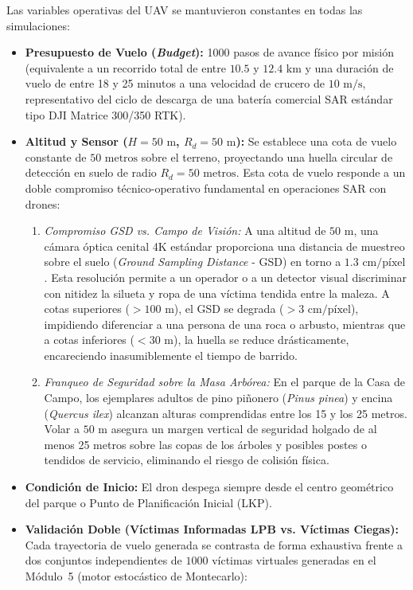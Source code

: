 Las variables operativas del UAV se mantuvieron constantes en todas las simulaciones:
\begin{itemize}
    \item \textbf{Presupuesto de Vuelo (\textit{Budget}):} 1000 pasos de avance físico por misión (equivalente a un recorrido total de entre $10.5$ y $12.4\text{ km}$ y una duración de vuelo de entre 18 y 25 minutos a una velocidad de crucero de $10\text{ m/s}$, representativo del ciclo de descarga de una batería comercial SAR estándar tipo DJI Matrice 300/350 RTK).
    \item \textbf{Altitud y Sensor ($H = 50\text{ m}$, $R_d = 50\text{ m}$):} Se establece una cota de vuelo constante de $50\text{ metros}$ sobre el terreno, proyectando una huella circular de detección en suelo de radio $R_d = 50\text{ metros}$. Esta cota de vuelo responde a un doble compromiso técnico-operativo fundamental en operaciones SAR con drones:
    \begin{enumerate}
        \item \textit{Compromiso GSD vs. Campo de Visión:} A una altitud de $50\text{ m}$, una cámara óptica cenital 4K estándar proporciona una distancia de muestreo sobre el suelo (\textit{Ground Sampling Distance} - GSD) en torno a $1.3\text{ cm/píxel}$. Esta resolución permite a un operador o a un detector visual discriminar con nitidez la silueta y ropa de una víctima tendida entre la maleza. A cotas superiores ($>100\text{ m}$), el GSD se degrada ($>3\text{ cm/píxel}$), impidiendo diferenciar a una persona de una roca o arbusto, mientras que a cotas inferiores ($<30\text{ m}$), la huella se reduce drásticamente, encareciendo inasumiblemente el tiempo de barrido.
        \item \textit{Franqueo de Seguridad sobre la Masa Arbórea:} En el parque de la Casa de Campo, los ejemplares adultos de pino piñonero (\textit{Pinus pinea}) y encina (\textit{Quercus ilex}) alcanzan alturas comprendidas entre los 15 y los 25 metros. Volar a $50\text{ m}$ asegura un margen vertical de seguridad holgado de al menos 25 metros sobre las copas de los árboles y posibles postes o tendidos de servicio, eliminando el riesgo de colisión física.
    \end{enumerate}
    \item \textbf{Condición de Inicio:} El dron despega siempre desde el centro geométrico del parque o Punto de Planificación Inicial (LKP).
    \item \textbf{Validación Doble (Víctimas Informadas LPB vs. Víctimas Ciegas):} Cada trayectoria de vuelo generada se contrasta de forma exhaustiva frente a dos conjuntos independientes de $1000$ víctimas virtuales generadas en el Módulo~5 (motor estocástico de Montecarlo):

\end{itemize}
